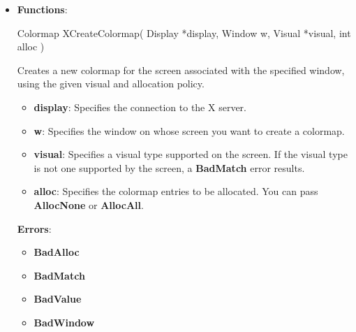 \documentclass{report}
\begin{document}
\begin{itemize}
\begin{cppcode}
                typedef struct {
                    XcmsFloat pad0;
                    XcmsFloat pad1;
                    XcmsFloat pad2;
                    XcmsFloat pad3;
                } XcmsPad; /* four doubles */
            \end{cppcode}
        \item \textbf{Functions}: 
            \begin{cppcode}
                Colormap XCreateColormap(
                    Display *display,
                    Window w,
                    Visual *visual,
                    int alloc
                )
            \end{cppcode}
            \bigbreak \noindent
            Creates a new colormap for the screen associated with the specified window, using the given visual and allocation policy.
            \begin{itemize}
                \item \textbf{display}: Specifies the connection to the X server.
                \item \textbf{w}: Specifies the window on whose screen you want to create a colormap.
                \item \textbf{visual}: Specifies a visual type supported on the screen. If the visual type is not one supported by the screen, a \textbf{BadMatch} error results.
                \item \textbf{alloc}: Specifies the colormap entries to be allocated. You can pass \textbf{AllocNone} or \textbf{AllocAll}.
            \end{itemize}
            \bigbreak \noindent
            \textbf{Errors}:
            \begin{itemize}
                \item \textbf{BadAlloc}
                \item \textbf{BadMatch}
                \item \textbf{BadValue}
                \item \textbf{BadWindow}
            \end{itemize}


\end{itemize}
\end{document}
